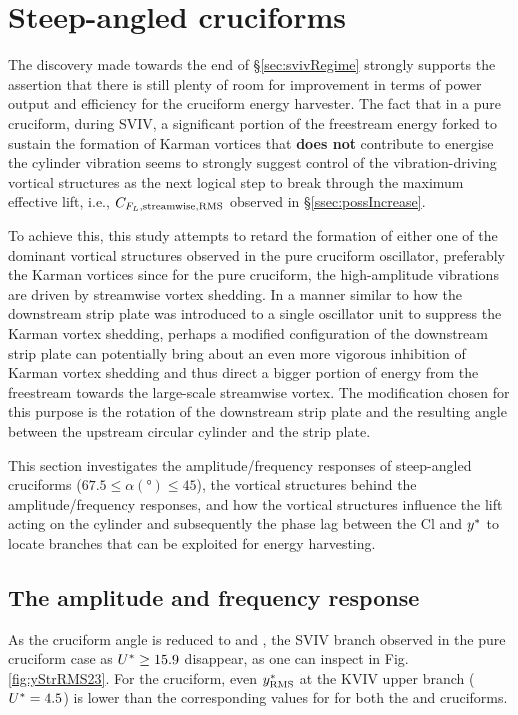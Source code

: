 \documentclass[oneside]{utmthesis}
\begin{document}
\section{Steep-angled cruciforms}\label{sec:transitionToKarman}
The discovery made towards the end of \S\ref{sec:svivRegime} strongly supports the assertion that there is still plenty of room for improvement in terms of power output and efficiency for the cruciform energy harvester. The fact that in a pure cruciform, during SVIV, a significant portion of the freestream energy forked to sustain the formation of Karman vortices that \textbf{does not} contribute to energise the cylinder vibration seems to strongly suggest control of the vibration-driving vortical structures as the next logical step to break through the maximum effective lift, i.e., $C_{F_{L},\text{streamwise},\text{RMS}}$ observed in \S\ref{ssec:possIncrease}.

To achieve this, this study attempts to retard the formation of either one of the dominant vortical structures observed in the pure cruciform oscillator, preferably the Karman vortices since for the pure cruciform, the high-amplitude vibrations are driven by streamwise vortex shedding. In a manner similar to how the downstream strip plate was introduced to a single oscillator unit to suppress the Karman vortex shedding, perhaps a modified configuration of the downstream strip plate can potentially bring about an even more vigorous inhibition of Karman vortex shedding and thus direct a bigger portion of energy from the freestream towards the large-scale streamwise vortex. The modification chosen for this purpose is the rotation of the downstream strip plate and the resulting angle between the upstream circular cylinder and the strip plate.

This section investigates the amplitude/frequency responses of steep-angled cruciforms ($67.5 \leq \alpha (\si{\degree}) \leq 45$), the vortical structures behind the amplitude/frequency responses, and how the vortical structures influence the lift acting on the cylinder and subsequently the phase lag between the Cl and $y^{*}$ to locate branches that can be exploited for energy harvesting.

\subsection{The amplitude and frequency response}\label{ssec:transRegimeAmpFreqResp}

As the cruciform angle is reduced to \angfo{} and \angth{}, the SVIV branch observed in the pure cruciform case as $U^{*} \geq 15.9$ disappear, as one can inspect in Fig. \ref{fig:yStrRMS23}. For the \angth{} cruciform, even $y^{*}_{\text{RMS}}$ at the KVIV upper branch ($U^{*} = 4.5$) is lower than the corresponding values for for both the \angfi{} and \angfo{} cruciforms.
\end{document}
